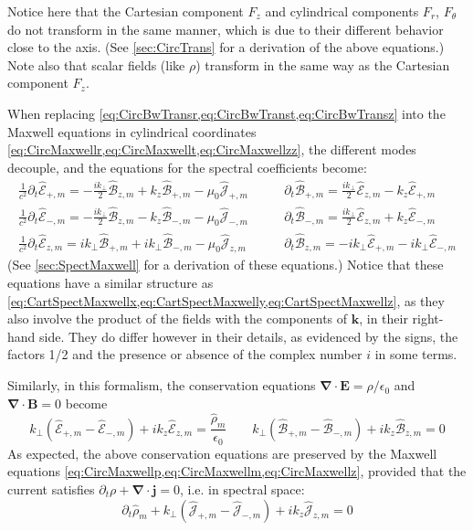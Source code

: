 \documentclass[a4paper]{article}   	%
\renewcommand{\vec}[1]{\boldsymbol{#1}}
\newcommand{\spectral}[1]{\hat{\mathcal{#1}}}
\begin{document}
\noindent Notice here that the Cartesian
component $F_z$ and cylindrical components
$F_r$, $F_\theta$ do not transform in the same manner, which is due
to their different behavior close to the axis. (See
\cref{sec:CircTrans} for a derivation of the above equations.) 
Note also that scalar fields (like $\rho$) transform in the
same way as the Cartesian component $F_z$. 

When replacing \cref{eq:CircBwTransr,eq:CircBwTranst,eq:CircBwTransz} into the Maxwell equations in cylindrical
coordinates \cref{eq:CircMaxwellr,eq:CircMaxwellt,eq:CircMaxwellzz},
the different modes decouple, and the equations for the spectral
coefficients become:
\begin{align}
\frac{1}{c^2}\partial_t \spectral{E}_{+,m} = - \frac{ik_\perp }{2}\spectral{B}_{z,m} + k_z\spectral{B}_{+,m} - \mu_0\spectral{J}_{+,m} \qquad &   
\partial_t \spectral{B}_{+,m} = \frac{ik_\perp }{2} \spectral{E}_{z,m} - k_z
\spectral{E}_{+,m} 
\label{eq:CircMaxwellp} \\
\frac{1}{c^2}\partial_t \spectral{E}_{-,m} = -\frac{ik_\perp }{2} \spectral{B}_{z,m} - k_z \spectral{B}_{-,m} - \mu_0  \spectral{J}_{-,m} \qquad &   
\partial_t \spectral{B}_{-,m} = \frac{ik_\perp }{2} \spectral{E}_{z,m} + k_z
\spectral{E}_{-,m} \label{eq:CircMaxwellm} \\
\frac{1}{c^2}\partial_t \spectral{E}_{z,m} = ik_\perp  \spectral{B}_{+,m} + ik_\perp \spectral{B}_{-,m}  - \mu_0 \spectral{J}_{z,m}  \qquad & 
\partial_t \spectral{B}_{z,m} = -ik_\perp  \spectral{E}_{+,m} - ik_\perp \spectral{E}_{-,m}  \label{eq:CircMaxwellz} 
\end{align}
(See \cref{sec:SpectMaxwell} for a derivation of these equations.)
Notice that these equations have a similar structure as 
\cref{eq:CartSpectMaxwellx,eq:CartSpectMaxwelly,eq:CartSpectMaxwellz}, as 
they also involve the product of the fields with the components of
$\vec{k}$, in their right-hand side. They do differ however in their
details, as evidenced by the signs, the factors 1/2 and the
presence or absence of the complex number $i$ in some terms.

Similarly, in this formalism, the conservation equations
$\vec{\nabla}\cdot\vec{E}=\rho/\epsilon_0$ and
$\vec{\nabla}\cdot\vec{B} = 0$
become
\begin{equation}
\label{eq:SpectCons}
k_\perp (\spectral{E}_{+,m} -\spectral{E}_{-,m}) + ik_z \spectral{E}_{z,m} =
\frac{\spectral{\rho}_m}{\epsilon_0} \qquad
 k_\perp (\spectral{B}_{+,m} -\spectral{B}_{-,m}) + ik_z \spectral{B}_{z,m} =
0 \end{equation}
As expected, the above conservation equations are
preserved by the Maxwell equations
\cref{eq:CircMaxwellp,eq:CircMaxwellm,eq:CircMaxwellz}, provided
that the current satisfies $\partial_t
\rho + \vec{\nabla} \cdot \vec{j} = 0$, i.e. in spectral space:
\begin{equation}
\label{eq:SpectCharge}
\partial_t \spectral{\rho}_m + k_\perp (\spectral{J}_{+,m} -\spectral{J}_{-,m}) + ik_z
\spectral{J}_{z,m} = 0
\end{equation}  
\end{document}
